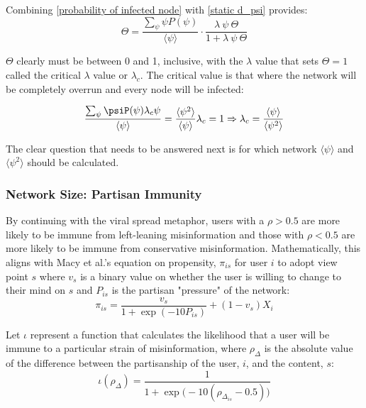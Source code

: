 \documentclass[preprint,review,12pt]{elsarticle}
\begin{document}
Combining \ref{probability of infected node} with \ref{static d_psi} provides:
\begin{equation}
    \Theta =  \frac{\sum_{\psi} \psi P(\psi)}{\langle \psi \rangle}\cdot \frac{\lambda \ \psi \ \Theta}{1 + \lambda \ \psi \ \Theta}
\end{equation}

$\Theta$ clearly must be between 0 and 1, inclusive, with the $\lambda$ value that sets $\Theta = 1$ called the critical $\lambda$ value or $\lambda_c$. The critical value is that where the network will be completely overrun and every node will be infected: 

\begin{equation}
\label{critical value equation}
    \frac{\sum_{\psi} \psiP(\psi)\lambda_c\psi}{\langle \psi \rangle} = \frac{\langle \psi^2 \rangle}{\langle \psi \rangle}\lambda_c = 1 \Rightarrow \lambda_c = \frac{\langle \psi \rangle}{\langle \psi^2 \rangle}
\end{equation}

The clear question that needs to be answered next is for which network $\langle \psi \rangle$ and $\langle \psi^2 \rangle$ should be calculated. 

\subsubsection{Network Size: Partisan Immunity}
By continuing with the viral spread metaphor, users with a $\rho > 0.5$ are more likely to be immune from left-leaning misinformation and those with  $\rho < 0.5$ are more likely to be immune from conservative misinformation. Mathematically, this aligns with Macy et al.'s equation on propensity, $\pi_{is}$ for user $i$ to adopt view point $s$ where $v_s$ is a binary value on whether the user is willing to change to their mind on $s$ and $P_{is}$ is the partisan "pressure" of the network:
\begin{equation}
\label{propensity}
    \pi_{is}=\frac{v_s}{1+\exp{(-10P_{is})}}+(1-v_{s})X_i
\end{equation}

Let $\iota$ represent a function that calculates the likelihood that a user will be immune to a particular strain of misinformation, where $\rho_{\Delta}$ is the absolute value of the difference between the partisanship of the user, $i$, and the content, $s$:
\begin{equation}
\label{immunity equation}
    \iota(\rho_{\Delta})=\frac{1}{1+\exp{\big(-10 (\rho_{\Delta_{is}}-0.5)\big)}}
\end{equation}
\end{document}
